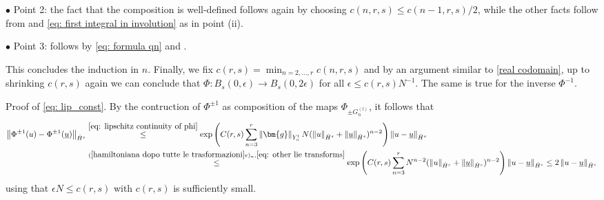 \documentclass[a4paper,10pt,reqno]{article}
\theoremstyle{definition}
\theoremstyle{plain}
\theoremstyle{plain}
\theoremstyle{definition}
\theoremstyle{plain}
\theoremstyle{plain}
\theoremstyle{plain}
\theoremstyle{definition}
\theoremstyle{definition}
\newcommand{\norm}[1]{\left\lVert #1 \right\rVert}
\begin{document}
\noindent $\bullet$ Point 2: the fact that the composition is well-defined follows again by choosing $c(n,r,s)\leq c(n-1,r,s)/2$, while the other facts follow from  and \eqref{eq: first integral in involution} as in point (ii).

\noindent $\bullet$ Point 3: follows by \eqref{eq: formula qn} and .

\medskip

This concludes the induction in $n$. Finally, we fix $c(r,s)=\min_{n=2,\ldots,r} c(n,r,s)$ and by an argument similar to \eqref{real codomain}, up to shrinking $c(r,s)$ again we can conclude that $\Phi : B_s(0,\epsilon) \rightarrow B_s(0,2\epsilon)$ for all $\epsilon \le c(r,s) N^{-1}$.
The same is true for the inverse $\Phi^{-1}$. 

\medskip

{\sc Proof of \eqref{eq: lip_const}.} By the contruction of $\Phi^{\pm 1}$ as composition of the maps $\Phi_{\pm G_n^{(l)}}$, it follows that
\[
\begin{split}
\norm{\Phi^{\pm 1}(u)-\Phi^{\pm 1}(\underline{u})}_{\dot{H}^s} & \stackrel{\eqref{eq: lipschitz continuity of phi}}{\le} \exp \left ( C(r,s) \sum_{n=3}^r \norm{\bm{g}}_{Y_n^l} N (\norm{u}_{\dot{H}^s}+\norm{\underline{u}}_{\dot{H}^s})^{n-2} \right ) \norm{u-\underline{u}}_{\dot{H}^s} \\
& \stackrel{(\ref{hamiltoniana dopo tutte le trasformazioni}e)_n,\eqref{eq: other lie transforms}}{\le} \exp \left ( C(r,s) \sum_{n=3}^r N^{n-2} (\norm{u}_{\dot{H}^s}+\norm{\underline{u}}_{\dot{H}^s})^{n-2} \right ) \norm{u-\underline{u}}_{\dot{H}^s} \le 2 \norm{u-\underline{u}}_{\dot{H}^s}
\end{split}
\]
using that $\epsilon N\leq c(r,s)$ with $c(r,s)$ is sufficiently small. \hfill \qedsymbol

\end{document}

